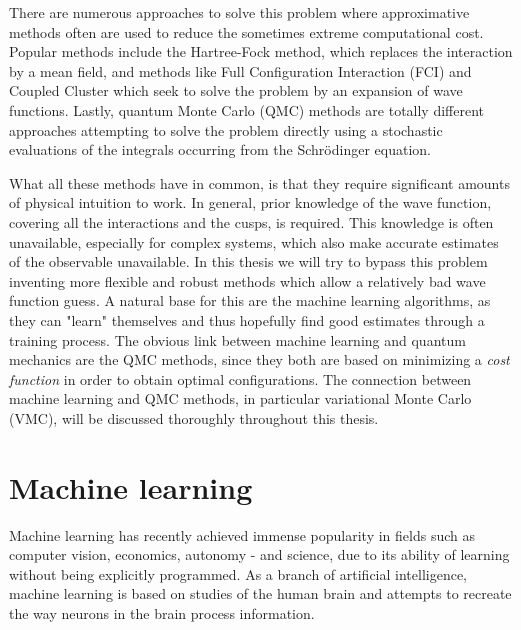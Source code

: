 There are numerous approaches to solve this problem where approximative methods often are used to reduce the sometimes extreme computational cost. Popular methods include the Hartree-Fock method, which replaces the interaction by a mean field, and methods like Full Configuration Interaction (FCI) and Coupled Cluster which seek to solve the problem by an expansion of wave functions. Lastly, quantum Monte Carlo (QMC) methods are totally different approaches attempting to solve the problem directly using a stochastic evaluations of the integrals occurring from the Schrödinger equation. 

What all these methods have in common, is that they require significant amounts of physical intuition to work. In general, prior knowledge of the wave function, covering all the interactions and the cusps, is required. This knowledge is often unavailable, especially for complex systems, which also make accurate estimates of the observable unavailable. In this thesis we will try to bypass this problem inventing more flexible and robust methods which allow a relatively bad wave function guess. A natural base for this are the machine learning algorithms, as they can "learn" themselves and thus hopefully find good estimates through a training process. The obvious link between machine learning and quantum mechanics are the QMC methods, since they both are based on minimizing a \textit{cost function} in order to obtain optimal configurations. The connection between machine learning and QMC methods, in particular variational Monte Carlo (VMC), will be discussed thoroughly throughout this thesis.

\section{Machine learning} \label{sec:machinelearning}
Machine learning has recently achieved immense popularity in fields such as computer vision, economics, autonomy - and science, due to its ability of learning without being explicitly programmed. As a branch of artificial intelligence, machine learning is based on studies of the human brain and attempts to recreate the way neurons in the brain process information. 

